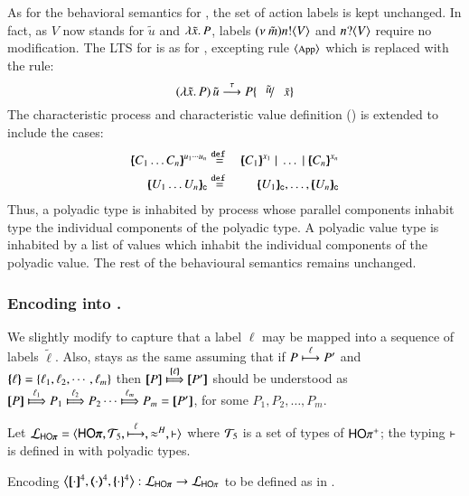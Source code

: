 As for the behavioral semantics for \pHOp, the 
set of action labels is kept unchanged. 
In fact, 
as $V$ now stands for $\tilde{u}$ and $\lambda \tilde{x}.\,P$, 
labels  $(\nu\ \tilde{m}) n ! \langle V \rangle$ and $n ? \langle V \rangle$
require no modification. 
The LTS for \pHOp is as for \HOp, 
excepting rule ${\footnotesize \langle \textrm{App} \rangle}$ which is replaced with the rule:
%
\[
	\appl{(\abs{\tilde{x}} P)}{\tilde{u}} \by{\tau} P\subst{\tilde{u}}{\tilde{x}}
\]
%
The characteristic process and characteristic value 
definition ()
is extended to include the cases:
\begin{eqnarray*}
	\mapchar{C_1 \dots C_n}{u_1 \cdots u_n} & \defeq &  \mapchar{C_1}{x_1} \Par \dots \Par \mapchar{C_n}{x_n} \\
	\omapchar{U_1 \dots U_n}  & \defeq &  \omapchar{U_1}, \dots, \omapchar{U_n}
\end{eqnarray*}
%
Thus, a polyadic type is inhabited by process whose
parallel components inhabit type the individual components of the polyadic
type. A polyadic value type is inhabited by a list
of values which inhabit the individual components of the polyadic value.
The rest of the behavioural semantics remains unchanged.


\subsubsection{Encoding \pHOp into \HOp.}

We slightly modify  to capture that a 
label $\ell$ may be mapped into a sequence of labels $\tilde{\ell}$.
Also,  stays as the same
assuming that if 
$P \stackrel{\ell}{\longmapsto} P'$ and $\{\!\!\{\ell\}\!\!\} = \{\ell_1, \ell_2,  \cdots, \ell_m\}$ then
$\map{P} \Hby{\mapa{\ell}} \map{P'}$
should be understood as
$\map{P} \Hby{\ell_1} P_1 \Hby{\ell_2} P_2 \cdots \Hby{\ell_m} P_m =  \map{P'}$,
for some
$P_1, P_2, \ldots, P_m$.

Let $\tyl{L}_{\pHOp}=\calc{\pHOp}{{\cal{T}}_5}{\hby{\ell}}{\wb}{\proves}$
where 
${\cal{T}}_5$ is a set of types of $\mathsf{HO}\pi^{\mathsf +}$;  
the typing $\vdash$ is defined in 
 with polyadic types.

\begin{definition}\rm
	\label{def:enc:pHOp_to_HOp}
	Encoding $\enco{\pmap{\cdot}{4}, \tmap{\cdot}{4}, \mapa{\cdot}^{4}}: \tyl{L}_{\pHOp} \to \tyl{L}_{\HOp}$
	to be defined as in .
\end{definition}

